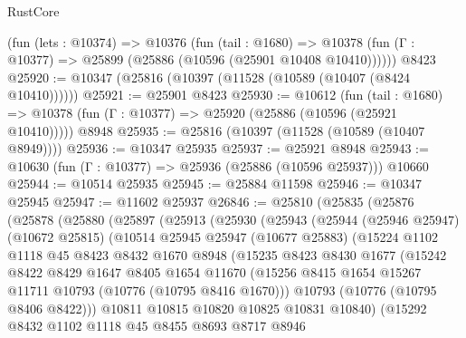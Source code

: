 \begin{lexlean}{RustCore}
\begin{coremodule}
    (fun (lets : @10374) =>
    @10376
      (fun (tail : @1680) =>
      @10378 (fun (Γ : @10377) => @25899 (@25886 (@10596 (@25901 @10408 @10410))))))
    @8423
@25920 := @10347 (@25816 (@10397 (@11528 (@10589 (@10407 (@8424 @10410))))))
@25921 := @25901 @8423
@25930 := @10612
    (fun (tail : @1680) => @10378 (fun (Γ : @10377) => @25920 (@25886 (@10596 (@25921 @10410)))))
    @8948
@25935 := @25816 (@10397 (@11528 (@10589 (@10407 @8949))))
@25936 := @10347 @25935
@25937 := @25921 @8948
@25943 := @10630 (fun (Γ : @10377) => @25936 (@25886 (@10596 @25937))) @10660
@25944 := @10514 @25935
@25945 := @25884 @11598
@25946 := @10347 @25945
@25947 := @11602 @25937
@26846 := @25810
    (@25835
      (@25876
        (@25878
          (@25880
            (@25897
              (@25913
                (@25930
                  (@25943
                    (@25944
                      (@25946 @25947)
                      (@10672 @25815)
                      (@10514
                        @25945
                        @25947
                        (@10677 @25883)
                        (@15224
                          @1102
                          @1118
                          @45
                          @8423
                          @8432
                          @1670
                          @8948
                          (@15235
                            @8423
                            @8430
                            @1677
                            (@15242
                              @8422
                              @8429
                              @1647
                              @8405
                              @1654
                              @11670
                              (@15256
                                @8415
                                @1654
                                @15267
                                @11711
                                @10793
                                (@10776 (@10795 @8416 @1670)))
                              @10793
                              (@10776 (@10795 @8406 @8422)))
                            @10811
                            @10815
                            @10820
                            @10825
                            @10831
                            @10840)
                          (@15292
                            @8432
                            @1102
                            @1118
                            @45
                            @8455
                            @8693
                            @8717
                            @8946

\end{coremodule}
\end{lexlean}
